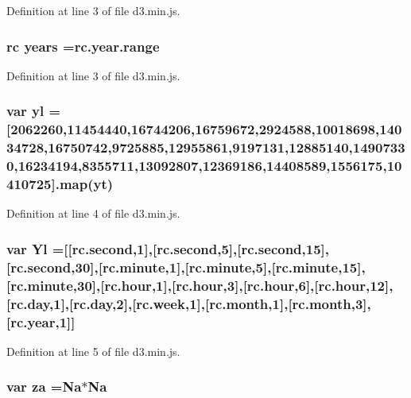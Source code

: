 Definition at line 3 of file d3.\+min.\+js.

\subsubsection[{years}]{ {\bf rc} years ={\bf rc.\+year.\+range}}\label{d3_8min_8js_a846d6786d689fa16bb667f70b952ae28}


Definition at line 3 of file d3.\+min.\+js.

\subsubsection[{yl}]{\setlength{\rightskip}{0pt plus 5cm}var yl =[2062260,11454440,16744206,16759672,2924588,10018698,14034728,16750742,9725885,12955861,9197131,12885140,14907330,16234194,8355711,13092807,12369186,14408589,1556175,10410725].{\bf map}(yt)}\label{d3_8min_8js_a0d5258ef8db86da82423ada876c76c91}


Definition at line 4 of file d3.\+min.\+js.

\subsubsection[{Yl}]{\setlength{\rightskip}{0pt plus 5cm}var Yl =[[{\bf rc.\+second},1],[{\bf rc.\+second},5],[{\bf rc.\+second},15],[{\bf rc.\+second},30],[{\bf rc.\+minute},1],[{\bf rc.\+minute},5],[{\bf rc.\+minute},15],[{\bf rc.\+minute},30],[{\bf rc.\+hour},1],[{\bf rc.\+hour},3],[{\bf rc.\+hour},6],[{\bf rc.\+hour},12],[{\bf rc.\+day},1],[{\bf rc.\+day},2],[{\bf rc.\+week},1],[{\bf rc.\+month},1],[{\bf rc.\+month},3],[{\bf rc.\+year},1]]}\label{d3_8min_8js_a35b431a48880f63962ba93ae453dd329}


Definition at line 5 of file d3.\+min.\+js.

\subsubsection[{za}]{\setlength{\rightskip}{0pt plus 5cm}var za ={\bf Na}$\ast${\bf Na}}\label{d3_8min_8js_a5e0643918b8b8927baf1883b01afd898}


